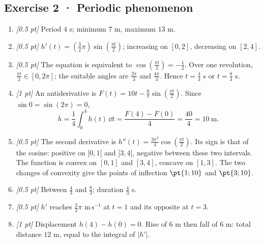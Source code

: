 \subsection*{Exercise 2 · Periodic phenomenon}\begin{enumerate}

\item \textit{[0.5 pt]} Period $4$ s; minimum $7$ m, maximum $13$ m.

\item \textit{[0.5 pt]} $h'(t)=(\frac{3}{2}\pi)\sin (\frac{\pi t}{2})$; increasing on $[0,2]$, decreasing on $[2,4]$.

\item \textit{[0.5 pt]} The equation is equivalent to $\cos (\frac{\pi t}{2})=-\frac{1}{2}$. Over one revolution, $\frac{\pi t}{2}\in[0,2\pi]$; the suitable angles are $\frac{2\pi}{3}$ and $\frac{4\pi}{3}$. Hence $t=\frac{4}{3}$ s or $t=\frac{8}{3}$ s.

\item \textit{[1 pt]} An antiderivative is $F(t)=10t-\frac{6}{\pi}\sin (\frac{\pi t}{2})$. Since $\sin0=\sin(2\pi)=0$,
\[\overline h=\frac{1}{4}\int_0^{4}h(t)\,\dd t=\frac{F(4)-F(0)}{4}=\frac{40}{4}=10\ \mathrm{m}.\]

\item \textit{[0.5 pt]} The second derivative is $h''(t)=\frac{3\pi^2}{4}\cos (\frac{\pi t}{2})$. Its sign is that of the cosine: positive on $[0,1[$ and $]3,4]$, negative between these two intervals. The function is convex on $[0,1]$ and $[3,4]$, concave on $[1,3]$. The two changes of convexity give the points of inflection $\pt{1;10}$ and $\pt{3;10}$.

\item \textit{[0.5 pt]} Between $\frac{4}{3}$ and $\frac{8}{3}$; duration $\frac{4}{3}$ s.

\item \textit{[0.5 pt]} $h'$ reaches $\frac{3}{2}\pi$ $\mathrm{m\,s^{-1}}$ at $t=1$ and its opposite at $t=3$.

\item \textit{[1 pt]} Displacement $h(4)-h(0)=0$. Rise of $6$ m then fall of $6$ m: total distance $12$ m, equal to the integral of $|h'|$.

\end{enumerate}

